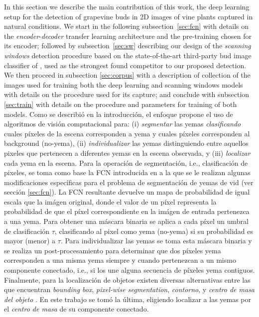 \documentclass[a4paper,authoryear,review]{elsarticle}
\begin{document}
In this section we describe the main contribution of this work, the  deep learning setup for the detection of grapevine buds in 2D images of vine plants captured in natural conditions. We start in the following subsection~\ref{sec:fcn} with details on the \emph{encoder}-\emph{decoder} transfer learning architecture and the pre-training chosen for its encoder; followed by subsection~\ref{sec:sw} describing our design of the \emph{scanning windows} detection procedure based on the state-of-the-art third-party bud image classifier of \cite{perez2017image}, used as the strongest found competitor to our proposed detection. 
%
We then proceed in subsection \ref{sec:corpus} with a description of collection of the images used for training both the deep learning and scanning windows models with details on the procedure used for its capture; and conclude with  subsection \ref{sec:train} with details on the procedure and parameters for training of both models.
%
Como se describió en la introducción, el enfoque propone el uso de algoritmos de visión computacional para: (i) \emph{segmentar} las yemas \emph{clasificando} cuales píxeles de la escena corresponden a yema y cuales píxeles corresponden al background (no-yema), (ii) \emph{individualizar} las yemas distinguiendo entre aquellos pixeles que pertenecen a diferentes yemas en la escena observada, y (iii) \emph{localizar} cada yema en la escena. Para la operación de segmentación, i.e., clasificación de pixeles, se toma como base la FCN introducida en \citep{long2015fully}  a la que se le realizan algunas modificaciones específicas para el problema de segmentación de yemas de vid (ver sección \ref{sec:fcn}). La FCN resultante devuelve un mapa de probabilidad de igual escala que la imágen original, donde el valor de un píxel representa la probabilidad de que el píxel correspondiente en la imágen de entrada pertenezca a una yema. Para obtener una máscara binaria se aplica a cada píxel un umbral de clasificación $\tau$, clasificando al pixel como yema (no-yema) si su probabilidad es mayor (menor) a $\tau$. Para individualizar las yemas se toma esta máscara binaria y se realiza un post-procesamiento para determinar que dos píxeles yema corresponden a una misma yema siempre y cuando pertenezcan a un mismo componente conectado, i.e., si los une alguna secuencia de píxeles yema contiguos. Finalmente, para la localización de objetos existen diversas alternativas entre las que encuentran \emph{bounding box}, \emph{pixel-wise segmentation}, \emph{contorno}, y \emph{centro de masa del objeto} \citep{lampert2008beyond}. En este trabajo se tomó la última, eligiendo localizar a las yemas por el \emph{centro de masa} de su componente conectado. 
\end{document}
